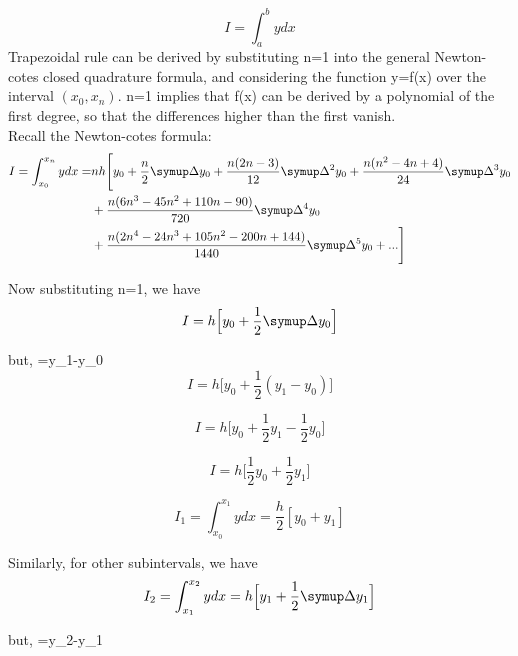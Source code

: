 \documentclass[a4paper,12pt]{report}
\numberwithin{equation}{section}
\begin{document}
\begin{equation*}
I=\int_{a}^{b}ydx
\end{equation*}
Trapezoidal rule can be derived by substituting n=1 into the general Newton-cotes closed quadrature formula, and considering the function y=f(x) over the interval $(x_0,x_n)$. n=1 implies that f(x) can be derived by a polynomial of the first degree, so that the differences higher than the first vanish.\\
Recall the Newton-cotes formula:
\begin{equation*}
\begin{split}
I=\int_{x_0}^{x_n}ydx=&nh\Bigg[y_0+\frac{n}{2}\symup\Delta{y_0}+\frac{n(2n-3)}{12}\symup\Delta^2y_0+\frac{n(n^2-4n+4)}{24}\symup\Delta^3y_0\\ 
&+\frac{n(6n^3-45n^2+110n-90)}{720}\symup\Delta^4y_0\\
&+\frac{n(2n^4-24n^3+105n^2-200n+144)}{1440}\symup\Delta^5y_0+...\Bigg]
\end{split}
\end{equation*}

Now substituting n=1, we have
\begin{equation*}
I=h\Big[y_0+\frac{1}{2}\symup\Delta{y_0}\Big]
\end{equation*}

but, \symup{}=y_1-y_0\\

\begin{equation*}
I=h\Big[y_0+\frac{1}{2}(y_1-y_0)\Big]
\end{equation*}

\begin{equation*}
I=h\Big[y_0+\frac{1}{2}y_1-\frac{1}{2}y_0\Big]
\end{equation*}

\begin{equation*}
I=h\Big[\frac{1}{2}y_0+\frac{1}{2}y_1\Big]
\end{equation*}

\begin{equation*}
I_1=\int_{x_0}^{x_1}ydx=\frac{h}{2}[y_0+y_1]
\end{equation*}


Similarly, for other subintervals, we have\\
\begin{equation*}
I_2=\int_{x_1}^{x_2}ydx=h\Big[y_1+\frac{1}{2}\symup\Delta{y_1}\Big]
\end{equation*}

but, \symup{}=y_2-y_1\\
\end{document}
